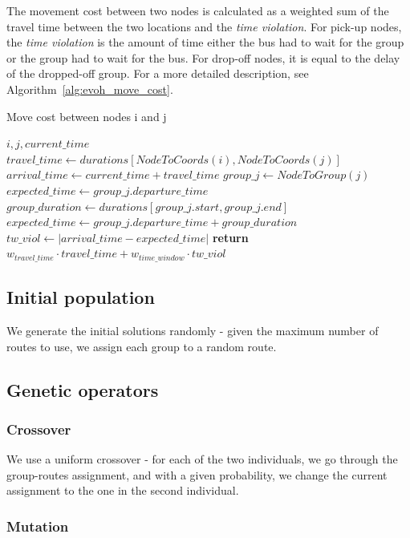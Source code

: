 The movement cost between two nodes is calculated as a weighted sum of the travel time between the two locations and the \textit{time violation}. For pick-up nodes, the \textit{time violation} is the amount of time either the bus had to wait for the group or the group had to wait for the bus. For drop-off nodes, it is equal to the delay of the dropped-off group. For a more detailed description, see Algorithm~\ref{alg:evoh_move_cost}.

\begin{algorithm}
\caption{Move cost between nodes i and j}
\label{alg:evoh_move_cost}
\begin{algorithmic}
\Require $i, j, current\_time$
\State $travel\_time \gets durations[NodeToCoords(i), NodeToCoords(j)]$
\State $arrival\_time \gets current\_time + travel\_time$
\State $group\_j \gets NodeToGroup(j)$
    \State $expected\_time \gets group\_j.departure\_time$
\Else
    \State $group\_duration \gets durations[group\_j.start, group\_j.end]$
    \State $expected\_time \gets group\_j.departure\_time + group\_duration$
\EndIf
\State $tw\_viol \gets |arrival\_time - expected\_time|$
\State \textbf{return} $w_{travel\_time} \cdot travel\_time + w_{time\_window} \cdot tw\_viol$
\end{algorithmic}
\end{algorithm}

\subsection{Initial population}

We generate the initial solutions randomly - given the maximum number of routes to use, we assign each group to a random route.

\subsection{Genetic operators}

\subsubsection{Crossover}

We use a uniform crossover - for each of the two individuals, we go through the group-routes assignment, and with a given probability, we change the current assignment to the one in the second individual.

\subsubsection{Mutation}

